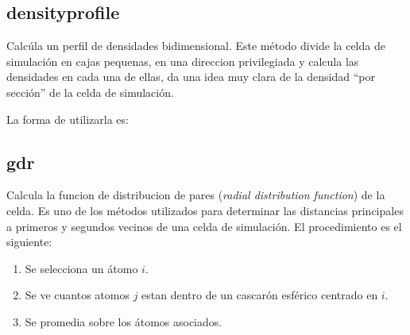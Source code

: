 \subsection{densityprofile}
Calc\'ula un perfil de densidades bidimensional. Este m\'etodo divide la celda de simulaci\'on en cajas pequenas, en una direccion privilegiada y calcula las densidades en cada una de ellas, da una idea muy clara de la densidad ``por secci\'on'' de la celda de simulaci\'on.

La forma de utilizarla es:



\subsection{gdr}
Calcula la funcion de distribucion de pares (\emph{radial distribution function}) de la celda. Es uno de los m\'etodos utilizados para determinar las distancias principales a primeros y segundos vecinos de una celda de simulaci\'on. El procedimiento es el siguiente:
\begin{enumerate}
 \item Se selecciona un \'atomo $i$.
 \item Se ve cuantos atomos $j$ estan dentro de un cascar\'on esf\'erico centrado en $i$.
 \item Se promedia sobre los \'atomos asociados.
\end{enumerate}


